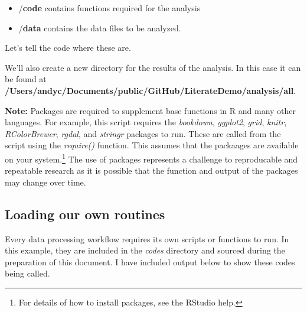 \documentclass[10pt,]{article}
\newenvironment{Shaded}{\begin{snugshade}}{\end{snugshade}}
\newcommand{\CharTok}[1]{\textcolor[rgb]{0.31,0.60,0.02}{#1}}
\newcommand{\CommentTok}[1]{\textcolor[rgb]{0.56,0.35,0.01}{\textit{#1}}}
\newcommand{\ControlFlowTok}[1]{\textcolor[rgb]{0.13,0.29,0.53}{\textbf{#1}}}
\newcommand{\DataTypeTok}[1]{\textcolor[rgb]{0.13,0.29,0.53}{#1}}
\newcommand{\KeywordTok}[1]{\textcolor[rgb]{0.13,0.29,0.53}{\textbf{#1}}}
\newcommand{\NormalTok}[1]{#1}
\newcommand{\StringTok}[1]{\textcolor[rgb]{0.31,0.60,0.02}{#1}}
\providecommand{\tightlist}{%
  \setlength{\itemsep}{0pt}\setlength{\parskip}{0pt}}
\let\rmarkdownfootnote\footnote%
\def\footnote{\protect\rmarkdownfootnote}
\begin{document}
\begin{itemize}
\tightlist
\item
  /\textbf{code} contains functions required for the analysis
\item
  /\textbf{data} contains the data files to be analyzed.
\end{itemize}

Let's tell the code where these are.

We'll also create a new directory for the results of the analysis. In this case it can be found at \textbf{/Users/andyc/Documents/public/GitHub/LiterateDemo/analysis/all}.

\textbf{Note:} Packages are required to supplement base functions in R and many other languages. For example, this script requires the \emph{bookdown}, \emph{ggplot2}, \emph{grid}, \emph{knitr}, \emph{RColorBrewer}, \emph{rgdal}, and \emph{stringr} packages to run. These are called from the script using the \emph{require()} function. This assumes that the packaages are available on your system.\footnote{For details of how to install packages, see the RStudio help.} The use of packages represents a challenge to reproducable and repeatable research as it is possible that the function and output of the packages may change over time.

\hypertarget{loading-our-own-routines}{%
\subsection{Loading our own routines}\label{loading-our-own-routines}}

Every data processing workflow requires its own scripts or functions to run. In this example, they are included in the \emph{codes} directory and sourced during the preparation of this document. I have included output below to show these codes being called.

\begin{Shaded}
\end{Shaded}
\end{document}

